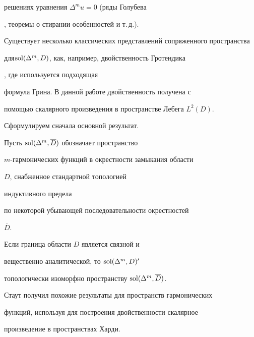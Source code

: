 решениях уравнения $\Delta ^m u = 0$ (ряды Голубева


\cite{Havi4}, теоремы о стирании особенностей \cite{Stou1} и т.\,д.).





Существует несколько классических представлений сопряженного пространства


для\linebreak $\operatorname{sol} (\Delta ^ m, D)$, как, например, двойственность Гротендика


\cite{Grot1}, где используется подходящая


формула Грина. В данной работе двойственность получена с


помощью скалярного произведения в пространстве Лебега $L^2 (D)$.





Сформулируем сначала основной результат.





Пусть $\operatorname{sol} (\Delta ^m, \overline D)$ обозначает пространство


$m$-гармонических функций в окрестности замыкания области


$D$, снабженное стандартной топологией


индуктивного предела


по некоторой убывающей последовательности окрестностей


$\overline D$.





\begin{thm} \label{t.main}


Если граница области $D$ является свя\-зной и


вещественно аналитической, то $\operatorname{sol} (\Delta ^m, D)^{\prime}$


топологически изоморфно пространству $\operatorname{sol} (\Delta ^m , \overline D)$.


\end{thm}





Стаут \cite{Stou1} получил похожие результаты для пространств гармонических


функций, используя для построения двойственности скалярное


произведение в пространствах Харди.





